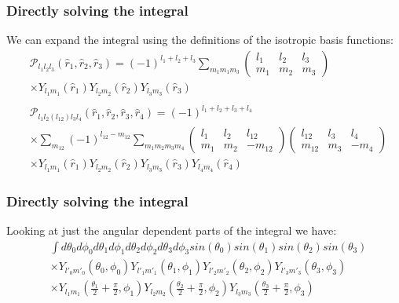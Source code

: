 \documentclass{beamer}
\begin{document}
    \begin{frame}
        \frametitle{Directly solving the integral}
        We can expand the integral using the definitions of the isotropic basis functions:
        \begin{align*}
            &\mathcal P_{l_1 l_2 l_3}(\hat r_1, \hat r_2, \hat r_3) = (-1)^{l_1+l_2+l_3} \sum_{m_1 m_1 m_3} 
            \begin{pmatrix}
            l_1 & l_2 & l_3\\
            m_1 & m_2 & m_3
            \end{pmatrix}\\
            &\times Y_{l_1 m_1}(\hat r_1)Y_{l_2 m_2}(\hat r_2)Y_{l_3 m_3}(\hat r_3)\\ 
            &\\
            &\mathcal P_{l_1 l_2 (l_{12}) l_3 l_4}(\hat r_1, \hat r_2, \hat r_3, \hat r_4) = (-1)^{l_1+l_2+l_3+l_4}\\
            &\times \sum_{m_{12}} (-1)^{l_{12}-m_{12}}
            \sum_{m_1 m_2 m_3 m_4}
            \begin{pmatrix}
                l_1 & l_2 & l_{12}\\
                m_1 & m_2 & -m_{12}
            \end{pmatrix}
            \begin{pmatrix}
                l_{12} & l_3 & l_4\\
                m_{12} & m_3 & -m_4
            \end{pmatrix}\\
            &\times Y_{l_1 m_1}(\hat r_1)Y_{l_2 m_2}(\hat r_2)Y_{l_3 m_3}(\hat r_3)Y_{l_4 m_4}(\hat r_4)
        \end{align*}
    \end{frame}

    \begin{frame}
        \frametitle{Directly solving the integral}
        Looking at just the angular dependent parts of the integral we have:
        \begin{align*}
            &\int d\theta_0 d\phi_0 d\theta_1 d\phi_1 d\theta_2 d\phi_2 d\theta_3 d\phi_3 sin(\theta_0) sin(\theta_1) sin(\theta_2) sin(\theta_3) \\
            &\times Y_{l'_0 m'_0}(\theta_0, \phi_0) Y_{l'_1 m'_1}(\theta_1, \phi_1) Y_{l'_2 m'_2}(\theta_2, \phi_2) Y_{l'_3 m'_3}(\theta_3, \phi_3) \\
            &\times Y_{l_1 m_1}(\frac{\theta_1}{2} + \frac{\pi}{2}, \phi_1) Y_{l_2 m_2}(\frac{\theta_2}{2} + \frac{\pi}{2}, \phi_2) Y_{l_3 m_3}(\frac{\theta_3}{2} + \frac{\pi}{2}, \phi_3)
        \end{align*}
    \end{frame}
\end{document}
